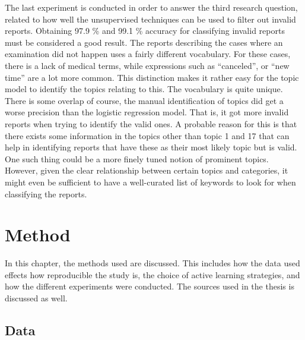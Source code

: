 The last experiment is conducted in order to answer the third research question, related to how well the unsupervised techniques can be used to filter out invalid reports.
Obtaining 97.9 \% and 99.1 \% accuracy for classifying invalid reports must be considered a good result.
The reports describing the cases where an examination did not happen uses a fairly different vocabulary.
For these cases, there is a lack of medical terms, while expressions such as ``canceled'', or ``new time'' are a lot more common.
This distinction makes it rather easy for the topic model to identify the topics relating to this.
The vocabulary is quite unique.
There is some overlap of course, the manual identification of topics did get a worse precision than the logistic regression model.
That is, it got more invalid reports when trying to identify the valid ones.
A probable reason for this is that there exists some information in the topics other than topic 1 and 17 that can help in identifying reports that have these as their most likely topic but is valid.
One such thing could be a more finely tuned notion of prominent topics.
However, given the clear relationship between certain topics and categories, it might even be sufficient to have a well-curated list of keywords to look for when classifying the reports.



\section{Method}
\label{sec:discussion-method}

In this chapter, the methods used are discussed.
This includes how the data used effects how reproducible the study is, the choice of active learning strategies,  and how the different experiments were conducted.
The sources used in the thesis is discussed as well.

\subsection{Data}

